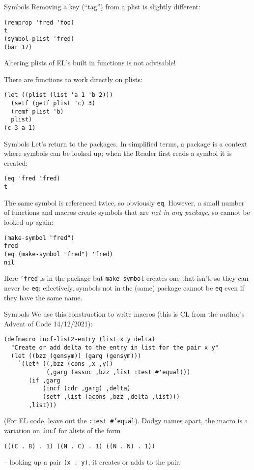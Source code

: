 \documentclass[presentation]{beamer}
\begin{document}
\begin{frame}[fragile]{Symbols}
Removing a key (``tag'') from a plist is slightly different:
\begin{verbatim}
(remprop 'fred 'foo)
t
(symbol-plist 'fred)
(bar 17)
\end{verbatim}

Altering plists of EL's built in functions is not advisable!

\medskip
There are functions to work directly on plists:
\begin{verbatim}
(let ((plist (list 'a 1 'b 2)))
  (setf (getf plist 'c) 3)
  (remf plist 'b)
  plist)
(c 3 a 1)
\end{verbatim}
\end{frame}

\begin{frame}[fragile]{Symbols}
Let's return to the packages.  In simplified terms, a package is a context where symbols can be looked up; when the Reader first reads a symbol it is created:
\begin{verbatim}
(eq 'fred 'fred)
t
\end{verbatim}
The same symbol is referenced twice, so obviously \texttt{eq}.  However, a small number of functions and macros create symbols that are \emph{not in any package}, so cannot be looked up again:
\begin{verbatim}
(make-symbol "fred")
fred
(eq (make-symbol "fred") 'fred)
nil
\end{verbatim}
Here \texttt{'fred} is in the package but \texttt{make-symbol} creates one that isn't, so they can never be \texttt{eq}: effectively, symbols not in the (same) package cannot be \texttt{eq} even if they have the same name.
\end{frame}

\begin{frame}[fragile]{Symbols}
We use this construction to write macros (this is CL from the author's Advent of Code 14/12/2021):
\begin{verbatim}
(defmacro incf-list2-entry (list x y delta)
  "Create or add delta to the entry in list for the pair x y"
  (let ((bzz (gensym)) (garg (gensym)))
    `(let* ((,bzz (cons ,x ,y))
            (,garg (assoc ,bzz ,list :test #'equal)))
       (if ,garg
           (incf (cdr ,garg) ,delta)
           (setf ,list (acons ,bzz ,delta ,list)))
       ,list)))
\end{verbatim}
(For EL code, leave out the \texttt{:test \#'equal}).  Dodgy names apart, the macro is a variation on \texttt{incf} for alists of the form
\begin{verbatim}
(((C . B) . 1) ((N . C) . 1) ((N . N) . 1))
\end{verbatim}
-- looking up a pair \texttt{(x . y)}, it creates or adds to the pair.
\end{frame}
\end{document}
